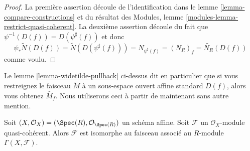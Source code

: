 \begin{proof}
La première assertion découle de l'identification dans
le lemme \ref{lemma-compare-constructions}
et du résultat des Modules, lemme \ref{modules-lemma-restrict-quasi-coherent}.
La deuxième assertion découle du fait
que $\psi^{-1}(D(f)) = D(\psi^\sharp(f))$ et donc
$$
\psi_* \widetilde N(D(f)) = \widetilde N(D(\psi^\sharp(f))) =
N_{\psi^\sharp(f)} = (N_R)_f = \widetilde{N_R}(D(f))
$$
comme voulu.
\end{proof}

\noindent
Le lemme \ref{lemma-widetilde-pullback} ci-dessus dit en particulier que
si vous restreignez le
faisceau $\widetilde M$ à un sous-espace ouvert affine standard
$D(f)$, alors vous obtenez $\widetilde{M_f}$. Nous utiliserons ceci à partir
de maintenant sans autre mention.

\begin{lemma}
\label{lemma-quasi-coherent-affine}
Soit $(X, \mathcal{O}_X) = (\Spec(R), \mathcal{O}_{\Spec(R)})$
un schéma affine. Soit $\mathcal{F}$ un
$\mathcal{O}_X$-module quasi-cohérent.
Alors $\mathcal{F}$ est isomorphe au faisceau associé
au $R$-module $\Gamma(X, \mathcal{F})$.
\end{lemma}

